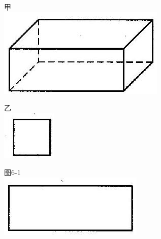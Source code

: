 \documentclass[10pt]{article}
\begin{document}
甲\\
\includegraphics[max width=\textwidth, center]{2024_10_30_26b590fd1106d28139f0g-034(4)}

乙\\
\includegraphics[max width=\textwidth, center]{2024_10_30_26b590fd1106d28139f0g-034}

图6-1\\
\includegraphics[max width=\textwidth, center]{2024_10_30_26b590fd1106d28139f0g-034(2)}
\end{document}
